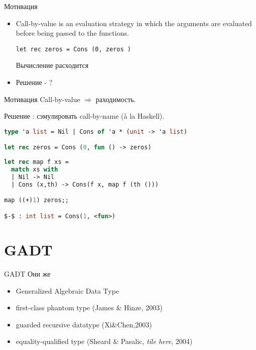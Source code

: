\documentclass[10pt, mathserif]{beamer}
\theoremstyle{definition}
\begin{document}
\begin{frame}[fragile]{Мотивация}
\begin{itemize}
 \item Call-by-value is an evaluation strategy in which the arguments are evaluated before being passed to the functions.
\begin{lstlisting}
let rec zeros = Cons (0, zeros )
\end{lstlisting}
Вычисление расходится
\item Решение - ?
\end{itemize}
\end{frame}

\begin{frame}[fragile]{Мотивация}
Call-by-value $\Rightarrow$ раходимость.

Решение : сэмулировать call-by-name (à la Haskell). 


\begin{lstlisting}[language=ocaml,mathescape=true]
type 'a list = Nil | Cons of 'a * (unit -> 'a list)

let rec zeros = Cons (0, fun () -> zeros)
\end{lstlisting}

\begin{lstlisting}[language=ocaml,mathescape=true]
let rec map f xs =
  match xs with
  | Nil -> Nil
  | Cons (x,th) -> Cons(f x, map f (th ()))

map ((+)1) zeros;;

$-$ : int list = Cons(1, <fun>)
\end{lstlisting}
\end{frame}


\section{GADT}

\begin{frame}[fragile]{GADT}
Они же
\begin{itemize}
\item Generalized Algebraic Data Type
\item first-class phantom type (James \& Hinze, 2003)
\item guarded recursive datatype (Xi\&Chen,2003)
\item equality-qualified type (Sheard \& Pasalic, \textit{tile here}, 2004)
\end{itemize}

\end{frame}
\end{document}
